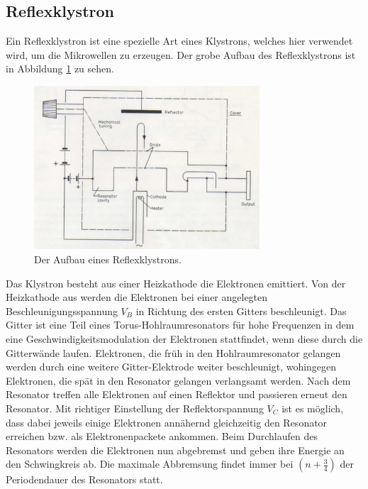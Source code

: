     \subsection{Reflexklystron}
    \label{sec:Reflexklystron}
        Ein Reflexklystron ist eine spezielle Art eines Klystrons, welches hier verwendet wird, um die Mikrowellen zu erzeugen.
        Der grobe Aufbau des Reflexklystrons ist in Abbildung \ref{fig:reflexklystron} zu sehen.
        \begin{figure}
            \centering
            \includegraphics[width = 0.75\textwidth]{bilder/Reflexklystron.png}
            \caption{Der Aufbau eines Reflexklystrons.}
            \label{fig:reflexklystron}
        \end{figure}
        Das Klystron besteht aus einer Heizkathode die Elektronen emittiert.
        Von der Heizkathode aus werden die Elektronen bei einer angelegten Beschleunigungsspannung $V_B$ in Richtung des ersten Gitters beschleunigt.
        Das Gitter ist eine Teil eines Torus-Hohlraumresonators für hohe Frequenzen in dem eine Geschwindigkeitsmodulation der Elektronen stattfindet, wenn diese durch die Gitterwände laufen.
        Elektronen, die früh in den Hohlraumresonator gelangen werden durch eine weitere Gitter-Elektrode weiter beschleunigt, wohingegen Elektronen, die spät in den Resonator gelangen verlangsamt werden. Nach dem Resonator treffen alle Elektronen auf einen Reflektor und passieren erneut den Resonator.
        Mit richtiger Einstellung der Reflektorspannung $V_C$ ist es möglich, dass dabei jeweils einige Elektronen annähernd gleichzeitig den Resonator erreichen bzw. als Elektronenpackete ankommen.
        Beim Durchlaufen des Resonators werden die Elektronen nun abgebremst und geben ihre Energie an den Schwingkreis ab. Die maximale Abbremsung findet immer bei $(n + \frac{3}{4})$ der Periodendauer des Resonators statt.
